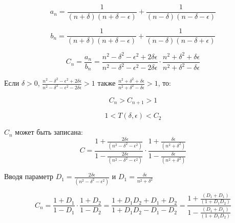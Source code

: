 \begin{equation}
	\label{eq:equation103}
	a_{n} = \frac{1}{(n + \delta)(n + \delta - \epsilon)} + \frac{1}{(n - \delta)(n - \delta - \epsilon)} 
\end{equation}

\begin{equation}
	\label{eq:equation104}
	b_{n} = \frac{1}{(n + \delta)(n + \delta - \epsilon)} + \frac{1}{(n - \delta)(n - \delta + \epsilon)} 
\end{equation}

\begin{equation}
	\label{eq:equation105}
	C_{n} = \frac{a_{n}}{b_{n}} = \frac{n^2 -\delta^2 - \epsilon^2 + 2\delta \epsilon}{n^2 -\delta^2 - \epsilon^2 - 2\delta \epsilon} \cdot \frac{n^2 + \delta^2 + \delta \epsilon}{n^2 + \delta^2 - \delta \epsilon}
\end{equation}

Если $\delta > 0$, $\frac{n^2 - \delta^2 - \epsilon^2 +2\delta \epsilon}{n^2 - \delta^2 - \epsilon^2 - 2\delta \epsilon} > 1$ также $\frac{n^2 + \delta^2 + \delta \epsilon}{n^2 + \delta^2 - \delta \epsilon} > 1$, то:

\begin{equation}
	\label{eq:equation106}
	C_{n} > C_{n + 1} > 1 
\end{equation}

\begin{equation}
	\label{eq:equation107}
	1 < T(\delta, \epsilon) < C_{2}
\end{equation} 

$C_{n}$ может быть записана:
\begin{equation}
	\label{eq:equation108}
	C = \frac{1 + \frac{2 \delta \epsilon}{(n^2 - \delta^2 - \epsilon^2)}}{1 - \frac{2 \delta \epsilon}{(n^2 - \delta^2 - \epsilon^2)}} \cdot \frac{1 + \frac{\delta \epsilon}{(n^2 + \delta^2)}}{1 - \frac{\delta \epsilon}{(n^2 + \delta^2)}}
\end{equation} 

Вводя параметр $D_{1} =  \frac{2 \delta \epsilon}{(n^2 - \delta^2 - \epsilon^2)}$ и $D_{1} =  \frac{\delta \epsilon}{n^2 + \delta^2}$

\begin{equation}
	\label{eq:equation109}
	C_{n} = \frac{1 + D_{1}}{1 - D_{1}} \cdot  \frac{1 + D_{2}}{1 - D_{2}} = \frac{1 + D_{1}D_{2} + D_{1} + D_{2}}{1 + D_{1}D_{2} - D_{1} - D_{2}} = \frac{1 + \frac{(D_{1} + D_{1})}{(1 + D_{1}D_{2})}}{1 - \frac{(D_{1} + D_{1})}{(1 + D_{1}D_{2})}}
\end{equation} 

